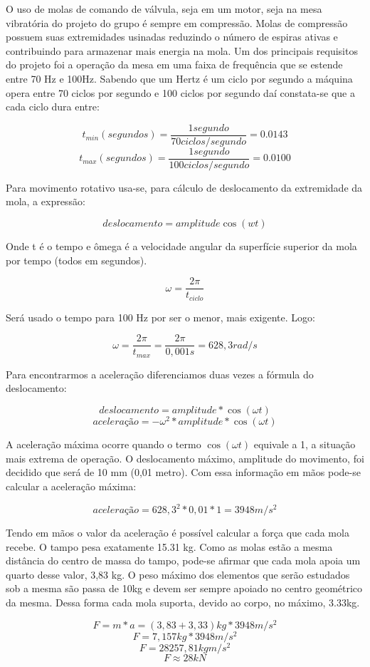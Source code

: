 O uso de molas de comando de válvula, seja em um motor, seja na mesa vibratória do projeto do grupo é sempre em compressão. 
Molas de compressão possuem suas extremidades usinadas reduzindo o número de espiras ativas e contribuindo para armazenar mais energia na mola.
Um dos principais requisitos do projeto foi a operação da mesa em uma faixa de frequência que se estende entre 70 Hz e 100Hz. 
Sabendo que um Hertz é um ciclo por segundo a máquina opera entre 70 ciclos por segundo e 100 ciclos por segundo daí constata-se que a cada ciclo dura entre:

$$t_{min} (segundos)=\frac{1segundo}{70 ciclos/segundo}=0.0143$$
$$t_{max} (segundos)=\frac{1segundo}{100 ciclos/segundo}=0.0100$$

Para movimento rotativo usa-se, para cálculo de deslocamento da extremidade da mola, a expressão:

$$deslocamento=amplitude \cos(wt)$$

Onde t é o tempo e ômega é a velocidade angular da superfície superior da mola por tempo (todos em segundos).

$$\omega=\frac{2\pi}{t_{ciclo}}$$

Será usado o tempo para 100 Hz por ser o menor, mais exigente. Logo:

$$\omega=\frac{2\pi}{t_{max}}=\frac{2\pi}{0,001s}=628,3rad/s$$

Para encontrarmos a aceleração diferenciamos duas vezes a fórmula do deslocamento:

$$deslocamento=amplitude * \cos(\omega t)$$
$$aceleração=-\omega^2 * amplitude * \cos(\omega t)$$

A aceleração máxima ocorre quando o termo $\cos(\omega t)$ equivale a 1, a situação mais extrema de operação. 
O deslocamento máximo, amplitude do movimento, foi decidido que será de 10 mm (0,01 metro). Com essa informação em mãos pode-se calcular a aceleração máxima:


$$aceleração =628,3^2 * 0,01 *1 =3948m/s^2 $$

Tendo em mãos o valor da aceleração é possível calcular a força que cada mola recebe. O tampo pesa exatamente 15.31 kg. 
Como as molas estão a mesma distância do centro de massa do tampo, pode-se afirmar que cada mola apoia um quarto desse valor, 3,83 kg. 
O peso máximo dos elementos que serão estudados sob a mesma são passa de 10kg e devem ser sempre apoiado no centro geométrico da mesma. 
Dessa forma cada mola suporta, devido ao corpo, no máximo, 3.33kg.

$$ F=m*a=(3,83+3,33)kg*3948m/s^2$$
$$ F=7,157kg*3948m/s^2$$
$$F=28257,81kg m/s^2$$
$$F\approx 28kN$$

